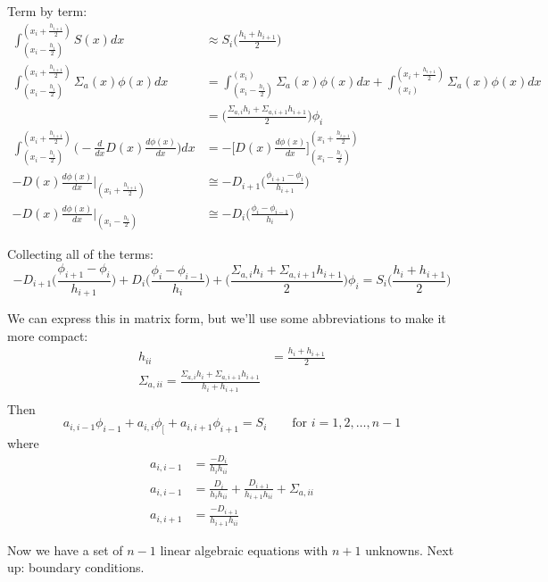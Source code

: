 \documentclass[12pt]{article}
\begin{document}
Term by term:
\begin{align}
\int_{(x_i - \frac{h_i}{2})}^{(x_i + \frac{h_{i+1}}{2})} S(x) dx &\approx S_i \bigl(\frac{h_i + h_{i+1}}{2}\bigr) \nonumber \\
%
\int_{(x_i - \frac{h_i}{2})}^{(x_i + \frac{h_{i+1}}{2})} \Sigma_a(x) \phi(x) dx &= 
\int_{(x_i - \frac{h_i}{2})}^{(x_i)} \Sigma_a(x) \phi(x) dx + \int_{(x_i)}^{(x_i + \frac{h_{i+1}}{2})} \Sigma_a(x) \phi(x) dx \nonumber\\&=
\biggl(\frac{\Sigma_{a,i}h_i + \Sigma_{a,i+1}h_{i+1}}{2} \biggr)\phi_i\nonumber \\
%
 \int_{(x_i - \frac{h_i}{2})}^{(x_i + \frac{h_{i+1}}{2})} \biggl(  -\frac{d}{dx}D(x)\frac{d \phi(x)}{dx}\biggr) dx &=
-\biggl[D(x)\frac{d \phi(x)}{dx} \biggr]_{(x_i - \frac{h_i}{2})}^{(x_i + \frac{h_{i+1}}{2})} \nonumber \\
%
-D(x)\frac{d \phi(x)}{dx}\big|_{(x_i + \frac{h_{i+1}}{2})} &\cong -D_{i+1}\biggl(\frac{\phi_{i+1} - \phi_i}{h_{i+1}}\biggr) \nonumber \\
%
-D(x)\frac{d \phi(x)}{dx}\big|_{(x_i - \frac{h_i}{2})} &\cong -D_{i}\biggl(\frac{\phi_{i} - \phi_{i-1}}{h_{i}}\biggr) \nonumber
\end{align}

Collecting all of the terms:
%
\begin{equation}
-D_{i+1}\biggl(\frac{\phi_{i+1} - \phi_i}{h_{i+1}}\biggr) + D_{i}\biggl(\frac{\phi_{i} - \phi_{i-1}}{h_{i}}\biggr) + \biggl(\frac{\Sigma_{a,i}h_i + \Sigma_{a,i+1}h_{i+1}}{2} \biggr)\phi_i =   S_i \bigl(\frac{h_i + h_{i+1}}{2}\bigr) \nonumber
\end{equation}

We can express this in matrix form, but we'll use some abbreviations to make it more compact:
\begin{align}
h_{ii} &= \frac{h_i + h_{i+1}}{2} \nonumber \\
%
\Sigma_{a,ii} = \frac{\Sigma_{a,i}h_i + \Sigma_{a,i+1}h_{i+1}}{h_i + h_{i+1}} \nonumber \\
\end{align}
Then
%
\[a_{i,i-1} \phi_{i-1} + a_{i,i}\phi_[ + a_{i, i+1} \phi_{i+1} = S_i \qquad \text{for } i = 1, 2, \dots, n-1 \]
%
where
%
\begin{align}
a_{i,i-1} &= \frac{-D_i}{h_i h_{ii}} \nonumber \\
a_{i,i-1} &= \frac{D_i}{h_i h_{ii}} + \frac{D_{i+1}}{h_{i+1} h_{ii}} +\Sigma_{a,ii} \nonumber \\
a_{i,i+1} &= \frac{-D_{i+1}}{h_{i+1} h_{ii}} \nonumber
\end{align}

Now we have a set of $n-1$ linear algebraic equations with $n+1$ unknowns. Next up: boundary conditions.


%
% 
\end{document}
